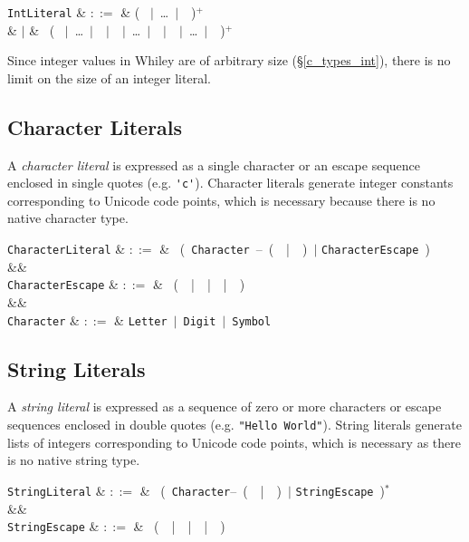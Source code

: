 \begin{syntax}
  \verb+IntLiteral+ & $::=$ & \big( \ $|$\ \ldots\ $|$\ \ \big)$^+$ \\
  & $|$ &  \ \big( \ $|$\ \ldots\ $|$\ \ $|$\ \ $|$\ \ldots\ $|$\ \ $|$\ \ $|$\ \ldots\ $|$\ \ \big)$^+$\\
\end{syntax}

Since integer values in Whiley are of arbitrary size (\S\ref{c_types_int}), there is no limit on the size of an integer literal.

\subsection{Character Literals}

A {\em character literal} is expressed as a single character or an escape sequence enclosed in single quotes (e.g. \lstinline{'c'}).  Character literals generate integer constants corresponding to Unicode code points, which is necessary because there is no native character type.

\begin{syntax}
  \verb+CharacterLiteral+ & $::=$ & \ \Big(\ \verb+Character+\ --\ \big(\ \token{\textbackslash}\ |\ \ \big)\ $|$ \verb+CharacterEscape+\ \Big)\  \\
  &&\\
  \verb+CharacterEscape+ & $::=$ & \token{\textbackslash}\ \big(\ \token{\textbackslash}\ |\ \ |\ \ |\ \ \big)\\
  &&\\
  \verb+Character+ & $::=$ & \verb+Letter+\ $|$\ \verb+Digit+\ $|$\ \verb+Symbol+\\

\end{syntax}

\subsection{String Literals}

A {\em string literal} is expressed as a sequence of zero or more characters or escape sequences enclosed in double quotes (e.g. \lstinline{"Hello World"}).  String literals generate lists of integers corresponding to Unicode code points, which is necessary as there is no native string type.

\begin{syntax}
  \verb+StringLiteral+ & $::=$ & \ \big(\ \verb+Character+--\ \big(\ \token{\textbackslash}\ |\ \ \big)\ $|$ \verb+StringEscape+\ \big)$^*$\  \\
  &&\\
  \verb+StringEscape+ & $::=$ & \token{\textbackslash}\ \big(\ \token{\textbackslash}\ |\ \ |\ \ |\ \ \big)\\

\end{syntax}

